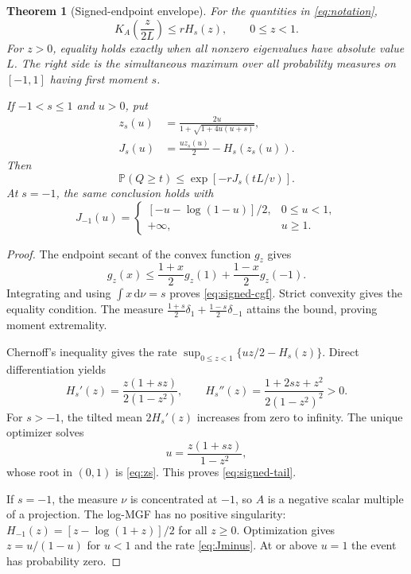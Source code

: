\documentclass[11pt,letterpaper]{article}
\numberwithin{equation}{section}
\newtheorem{theorem}{Theorem}[section]
\theoremstyle{definition}\newtheorem{definition}[theorem]{Definition}
\theoremstyle{remark}\newtheorem{remark}[theorem]{Remark}
\newcommand{\PP}{\mathbb P}
\newcommand{\dd}{\,\mathrm d}
\begin{document}
\begin{theorem}[Signed-endpoint envelope]\label{thm:signed}
For the quantities in \eqref{eq:notation},
\begin{equation}\label{eq:signed-cgf}
 K_A\left(\frac{z}{2L}\right)\le rH_s(z),\qquad 0\le z<1.
\end{equation}
For $z>0$, equality holds exactly when all nonzero eigenvalues have
absolute value $L$. The right side is the simultaneous maximum over
all probability measures on $[-1,1]$ having first moment $s$.

If $-1<s\le1$ and $u>0$, put
\begin{align}
 z_s(u)&=\frac{2u}{1+\sqrt{1+4u(u+s)}},\label{eq:zs}\\
 J_s(u)&=\frac{u z_s(u)}2-H_s(z_s(u)).\label{eq:Js}
\end{align}
Then
\begin{equation}\label{eq:signed-tail}
 \PP(Q\ge t)\le \exp[-rJ_s(tL/v)].
\end{equation}
At $s=-1$, the same conclusion holds with
\begin{equation}\label{eq:Jminus}
 J_{-1}(u)=\begin{cases}
 [-u-\log(1-u)]/2,&0\le u<1,\\
 +\infty,&u\ge1.
 \end{cases}
\end{equation}
\end{theorem}
\begin{proof}
The endpoint secant of the convex function $g_z$ gives
\[
 g_z(x)\le\frac{1+x}{2}g_z(1)+\frac{1-x}{2}g_z(-1).
\]
Integrating and using $\int x\dd\nu=s$ proves
\eqref{eq:signed-cgf}. Strict convexity gives the equality condition.
The measure $\frac{1+s}{2}\delta_1+\frac{1-s}{2}\delta_{-1}$ attains the
bound, proving moment extremality.

Chernoff's inequality gives the rate
$\sup_{0\le z<1}\{uz/2-H_s(z)\}$. Direct differentiation yields
\begin{equation}\label{eq:derivatives}
 H_s'(z)=\frac{z(1+sz)}{2(1-z^2)},\qquad
 H_s''(z)=\frac{1+2sz+z^2}{2(1-z^2)^2}>0.
\end{equation}
For $s>-1$, the tilted mean $2H_s'(z)$ increases from zero to infinity.
The unique optimizer solves
\begin{equation}\label{eq:saddle}
 u=\frac{z(1+sz)}{1-z^2},
\end{equation}
whose root in $(0,1)$ is \eqref{eq:zs}. This proves
\eqref{eq:signed-tail}.

If $s=-1$, the measure $\nu$ is concentrated at $-1$, so $A$ is a
negative scalar multiple of a projection. The log-MGF has no positive
singularity: $H_{-1}(z)=[z-\log(1+z)]/2$ for all $z\ge0$.
Optimization gives $z=u/(1-u)$ for $u<1$ and the rate
\eqref{eq:Jminus}. At or above $u=1$ the event has probability zero.
\end{proof}
\end{document}
